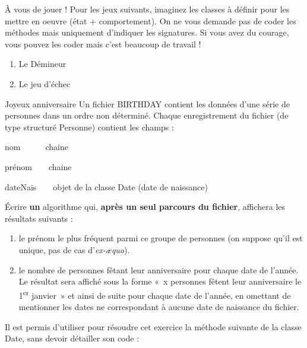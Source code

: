 \begin{Exercice}{À vous de jouer !}
	Pour les jeux suivants, imaginez les classes à
	définir pour les mettre en oeuvre (état + comportement). On ne vous
	demande pas de coder les méthodes mais uniquement d’indiquer les
	signatures. Si vous avez du courage, vous pouvez les coder mais c’est
	beaucoup de travail !

	\begin{enumerate}[label=\alph*)]
		\item 
			Le Démineur
		\item 
			Le jeu d’échec
	\end{enumerate}
\end{Exercice}

\begin{Exercice}{Joyeux anniversaire}
	Un fichier BIRTHDAY contient les données d’une série de personnes dans
	un ordre non déterminé. Chaque enregistrement du fichier (de type
	structuré Personne) contient les champs :

	\begin{liste}
		\item 
			nom\ \ \ \ \ \ chaine
		\item 
			prénom\ \ \ \ chaine
		\item 
			dateNais\ \ \ \ objet de la classe Date (date de naissance)
	\end{liste}
	
	Écrire \textbf{un} algorithme qui, \textbf{après un seul parcours du
	fichier}, affichera les résultats suivants :

	\begin{enumerate}[label=\alph*)]
		\item 
			le prénom le plus fréquent parmi ce groupe de personnes (on suppose
			qu’il est unique, pas de cas d’\textit{ex-æquo}).
		\item 
			le nombre de personnes fêtant leur anniversaire pour chaque date de
			l’année. Le résultat sera affiché sous la forme «~x personnes fêtent
			leur anniversaire le 1\textsuperscript{er} janvier~» et ainsi de suite
			pour chaque date de l’année, en omettant de mentionner les dates ne
			correspondant à aucune date de naissance du fichier.
	\end{enumerate}
	
	Il est permis d’utiliser pour résoudre cet exercice la méthode suivante
	de la classe Date, sans devoir détailler son code :



\end{Exercice}
